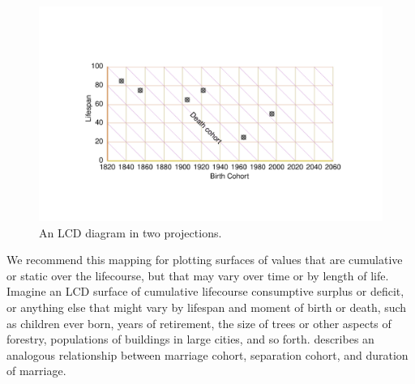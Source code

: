 \documentclass[12pt,oneside,a4paper]{article} %
\theoremstyle{definition}
\begin{document}
\begin{figure}[h!] 
\caption{An LCD diagram in two projections.}
\label{fig:LCD}
\centering
\vspace{-5em}
\includegraphics[scale=0.8]{Figures/LCDrt.pdf}
\end{figure} 

We
recommend this mapping for plotting surfaces of values that are cumulative or
static over the lifecourse, but that may vary over time or by length of life.
Imagine an LCD surface of cumulative lifecourse consumptive surplus or deficit, or anything else that might vary by lifespan and
moment of birth or death, such as children ever born, years of retirement, the
size of trees or other aspects of forestry, populations of buildings in large
cities, and so forth. \citet{lexis1875einleitung} describes an analogous
relationship between marriage cohort, separation cohort, and duration of
marriage.
\end{document}

